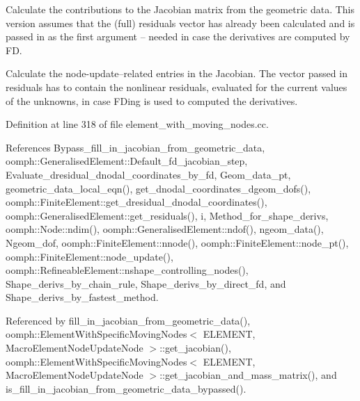 Calculate the contributions to the Jacobian matrix from the geometric data. This version assumes that the (full) residuals vector has already been calculated and is passed in as the first argument -- needed in case the derivatives are computed by FD. 

Calculate the node-\/update--related entries in the Jacobian. The vector passed in residuals has to contain the nonlinear residuals, evaluated for the current values of the unknowns, in case F\+Ding is used to computed the derivatives. 

Definition at line 318 of file element\+\_\+with\+\_\+moving\+\_\+nodes.\+cc.



References Bypass\+\_\+fill\+\_\+in\+\_\+jacobian\+\_\+from\+\_\+geometric\+\_\+data, oomph\+::\+Generalised\+Element\+::\+Default\+\_\+fd\+\_\+jacobian\+\_\+step, Evaluate\+\_\+dresidual\+\_\+dnodal\+\_\+coordinates\+\_\+by\+\_\+fd, Geom\+\_\+data\+\_\+pt, geometric\+\_\+data\+\_\+local\+\_\+eqn(), get\+\_\+dnodal\+\_\+coordinates\+\_\+dgeom\+\_\+dofs(), oomph\+::\+Finite\+Element\+::get\+\_\+dresidual\+\_\+dnodal\+\_\+coordinates(), oomph\+::\+Generalised\+Element\+::get\+\_\+residuals(), i, Method\+\_\+for\+\_\+shape\+\_\+derivs, oomph\+::\+Node\+::ndim(), oomph\+::\+Generalised\+Element\+::ndof(), ngeom\+\_\+data(), Ngeom\+\_\+dof, oomph\+::\+Finite\+Element\+::nnode(), oomph\+::\+Finite\+Element\+::node\+\_\+pt(), oomph\+::\+Finite\+Element\+::node\+\_\+update(), oomph\+::\+Refineable\+Element\+::nshape\+\_\+controlling\+\_\+nodes(), Shape\+\_\+derivs\+\_\+by\+\_\+chain\+\_\+rule, Shape\+\_\+derivs\+\_\+by\+\_\+direct\+\_\+fd, and Shape\+\_\+derivs\+\_\+by\+\_\+fastest\+\_\+method.



Referenced by fill\+\_\+in\+\_\+jacobian\+\_\+from\+\_\+geometric\+\_\+data(), oomph\+::\+Element\+With\+Specific\+Moving\+Nodes$<$ E\+L\+E\+M\+E\+N\+T, Macro\+Element\+Node\+Update\+Node $>$\+::get\+\_\+jacobian(), oomph\+::\+Element\+With\+Specific\+Moving\+Nodes$<$ E\+L\+E\+M\+E\+N\+T, Macro\+Element\+Node\+Update\+Node $>$\+::get\+\_\+jacobian\+\_\+and\+\_\+mass\+\_\+matrix(), and is\+\_\+fill\+\_\+in\+\_\+jacobian\+\_\+from\+\_\+geometric\+\_\+data\+\_\+bypassed().

\mbox{\label{classoomph_1_1ElementWithMovingNodes_ac9750cea96c52b31fe059ba109fea076}} 
